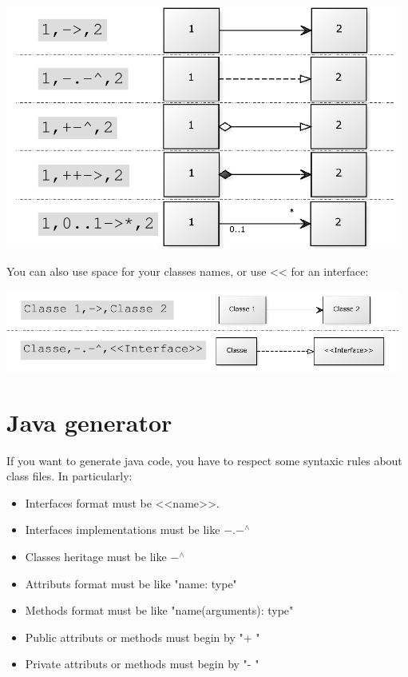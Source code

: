 \documentclass[a4paper,11pt]{article}
\begin{document}
\includegraphics[width=13cm]{liaisons2}


You can also use space for your classes names, or use << for an interface:

\includegraphics[width=13cm]{liaisons1}

\section*{Java generator}
\label{java}
If you want to generate java code, you have to respect some syntaxic rules about class files.
In particularly:

\begin{itemize}
\item Interfaces format must be <<name>>.
\item Interfaces implementations must be like $-.-^{\wedge}$
\item Classes heritage must be like $-^{\wedge}$
\item Attributs format must be like "name: type"
\item Methods format must be like "name(arguments): type"
\item Public attributs or methods must begin by "+ "
\item Private attributs or methods must begin by "- "
\end{itemize}
\end{document}
